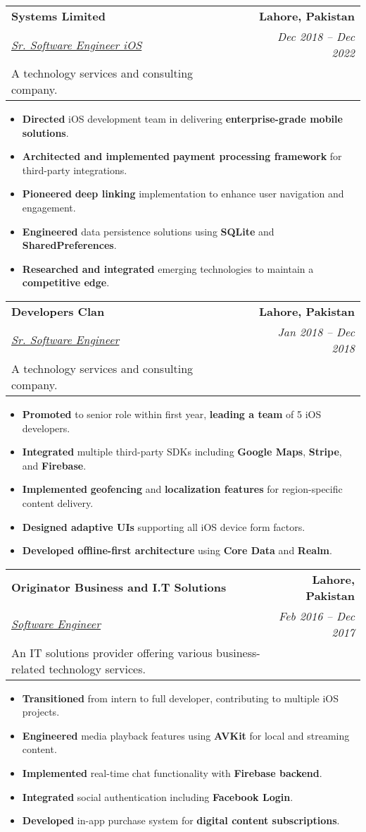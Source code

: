 \documentclass[a4paper,10pt]{article}
\makeatletter
\newcommand{\resumeItem}[1]{
  \item\small{
    {#1}\vspace{-2pt}
  }
}
\newcommand{\resumeSubheadingExperience}[5]{
  \vspace{-2pt}\item
    \begin{tabular*}{1.0\textwidth}[t]{l@{\extracolsep{\fill}}r}
      \textbf{\large#1} & \textbf{\small #2} \\
      \textit{\underline{#3}} & \textit{\small #4} \\
      {\small#5} & \\
    \end{tabular*}\vspace{-7pt}
}
\newcommand{\resumeItemListStart}{\begin{itemize}}
\newcommand{\resumeItemListEnd}{\end{itemize}\vspace{-5pt}}
\makeatother
\begin{document}
    \resumeSubheadingExperience
        {Systems Limited}{Lahore, Pakistan}
        {Sr. Software Engineer iOS}{Dec 2018 -- Dec 2022}
        {A technology services and consulting company.}
        \resumeItemListStart
            \resumeItem{\textbf{Directed} iOS development team in delivering \textbf{enterprise-grade mobile solutions}.}
            \resumeItem{\textbf{Architected and implemented} \textbf{payment processing framework} for third-party integrations.}
            \resumeItem{\textbf{Pioneered} \textbf{deep linking} implementation to enhance user navigation and engagement.}
            \resumeItem{\textbf{Engineered} data persistence solutions using \textbf{SQLite} and \textbf{SharedPreferences}.}
            \resumeItem{\textbf{Researched and integrated} emerging technologies to maintain a \textbf{competitive edge}.}
        \resumeItemListEnd

    \resumeSubheadingExperience
        {Developers Clan}{Lahore, Pakistan}
        {Sr. Software Engineer}{Jan 2018 -- Dec 2018}
        {A technology services and consulting company.}
        \resumeItemListStart
            \resumeItem{\textbf{Promoted} to senior role within first year, \textbf{leading a team} of 5 iOS developers.}
            \resumeItem{\textbf{Integrated} multiple third-party SDKs including \textbf{Google Maps}, \textbf{Stripe}, and \textbf{Firebase}.}
            \resumeItem{\textbf{Implemented} \textbf{geofencing} and \textbf{localization features} for region-specific content delivery.}
            \resumeItem{\textbf{Designed adaptive UIs} supporting all iOS device form factors.}
            \resumeItem{\textbf{Developed offline-first architecture} using \textbf{Core Data} and \textbf{Realm}.}
        \resumeItemListEnd

    \resumeSubheadingExperience
        {Originator Business and I.T Solutions}{Lahore, Pakistan}
        {Software Engineer}{Feb 2016 -- Dec 2017}
        {An IT solutions provider offering various business-related technology services.}
        \resumeItemListStart
            \resumeItem{\textbf{Transitioned} from intern to full developer, contributing to multiple iOS projects.}
            \resumeItem{\textbf{Engineered} media playback features using \textbf{AVKit} for local and streaming content.}
            \resumeItem{\textbf{Implemented} real-time chat functionality with \textbf{Firebase backend}.}
            \resumeItem{\textbf{Integrated} social authentication including \textbf{Facebook Login}.}
            \resumeItem{\textbf{Developed} in-app purchase system for \textbf{digital content subscriptions}.}
        \resumeItemListEnd
\end{document}
